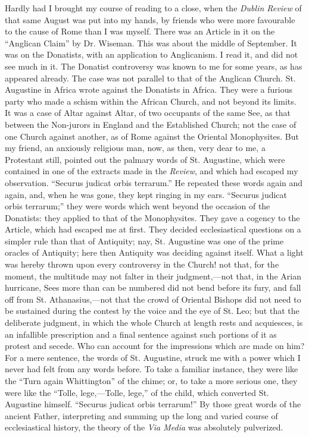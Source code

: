 Hardly had I brought my course of reading to a close, when the \emph{Dublin
Review} of that same August was put into my hands, by friends who were
more favourable to the cause of Rome than I was myself. There was an
Article in it on the ``Anglican Claim'' by Dr. Wiseman. This was about the middle of September. It was on the Donatists,
with an application to Anglicanism. I read it, and did not see much in
it. The Donatist controversy was known to me for some years, as has
appeared already. The case was not parallel to that of the
Anglican Church. St. Augustine in Africa wrote against the Donatists in
Africa. They were a furious party who made a schism within the African
Church, and not beyond its limits. It was a case of Altar against Altar,
of two occupants of the same See, as that between the Non-jurors in
England and the Established Church; not the case of one Church against
another, as of Rome against the Oriental Monophysites. But my friend, an
anxiously religious man, now, as then, very dear to me, a Protestant
still, pointed out the palmary words of St. Augustine, which were
contained in one of the extracts made in the \emph{Review}, and which had
escaped my observation. ``Securus judicat orbis terrarum.'' He
repeated these words again and again, and, when he was gone, they kept
ringing in my ears. ``Securus judicat orbis terrarum;'' they
were words which went beyond the occasion of the Donatists: they applied
to that of the Monophysites. They gave a cogency to the Article,
which had escaped me at first. They decided ecclesiastical questions on
a simpler rule than that of Antiquity; nay, St. Augustine was one of the
prime oracles of Antiquity; here then Antiquity was deciding against
itself. What a light was hereby thrown upon every controversy in the
Church! not that, for the moment, the multitude may not falter in their
judgment,—not that, in the Arian hurricane, Sees more than can be
numbered did not bend before its fury, and fall off from St. Athanasius,—not
that the crowd of Oriental Bishops did not need to be sustained during
the contest by the voice and the eye of St. Leo; but that the deliberate
judgment, in which the whole Church at length rests and acquiesces, is
an infallible prescription and a final sentence against such portions of
it as protest and secede. Who can account for the impressions which are
made on him? For a mere sentence, the words of St. Augustine, struck me
with a power which I never had felt from any words before. To take a
familiar instance, they were like the ``Turn again Whittington''
of the chime; or, to take a more serious one, they were like the ``Tolle,
lege,—Tolle, lege,'' of the child, which converted St. Augustine
himself. ``Securus judicat orbis terrarum!'' By those great
words of the ancient Father, interpreting and summing up the long
and varied course of ecclesiastical history, the theory of the \emph{Via
Media} was absolutely pulverized.

